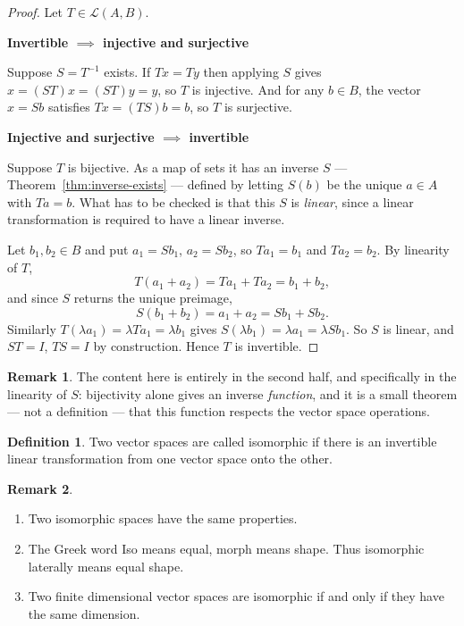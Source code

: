 \documentclass[11pt,a4paper]{article}
\theoremstyle{definition}
\newtheorem{defn}[thm]{Definition}
\newtheorem*{remark}{Remark}
\newcommand{\subhead}[1]{%
  \par\medskip\noindent\textbf{#1}\par\nobreak\smallskip}
\begin{document}
\begin{proof}
Let $T\in\mathcal{L}(A,B)$.

\subhead{Invertible $\implies$ injective and surjective}
Suppose $S=T^{-1}$ exists. If $Tx=Ty$ then applying $S$ gives
$x=(ST)x=(ST)y=y$, so $T$ is injective. And for any $b\in B$, the vector
$x=Sb$ satisfies $Tx=(TS)b=b$, so $T$ is surjective.

\subhead{Injective and surjective $\implies$ invertible}
Suppose $T$ is bijective. As a map of sets it has an inverse $S$ ---
Theorem~\ref{thm:inverse-exists} --- defined by letting $S(b)$ be the unique
$a\in A$ with $Ta=b$. What has to be checked is that this $S$ is
\emph{linear}, since a linear transformation is required to have a linear
inverse.

Let $b_1,b_2\in B$ and put $a_1=Sb_1$, $a_2=Sb_2$, so $Ta_1=b_1$ and
$Ta_2=b_2$. By linearity of $T$,
$$T(a_1+a_2)=Ta_1+Ta_2=b_1+b_2,$$
and since $S$ returns the unique preimage,
$$S(b_1+b_2)=a_1+a_2=Sb_1+Sb_2.$$
Similarly $T(\lambda a_1)=\lambda Ta_1=\lambda b_1$ gives
$S(\lambda b_1)=\lambda a_1=\lambda Sb_1$. So $S$ is linear, and $ST=I$,
$TS=I$ by construction. Hence $T$ is invertible.
\end{proof}

\begin{remark}
The content here is entirely in the second half, and specifically in the
linearity of $S$: bijectivity alone gives an inverse \emph{function}, and it is
a small theorem --- not a definition --- that this function respects the vector
space operations.
\end{remark}


\begin{defn}
Two vector spaces are called isomorphic if there is an invertible linear transformation from one vector space onto the other.
\end{defn}

\begin{remark}
\begin{enumerate}
\item Two isomorphic spaces have the same properties.
\item The Greek word Iso means equal, morph means shape. Thus isomorphic laterally means equal shape.
\item Two finite dimensional vector spaces are isomorphic if and only if they have the same dimension.
\end{enumerate}
\end{remark}
\end{document}
